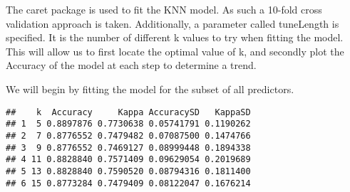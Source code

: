 \documentclass[
]{article}
\newenvironment{Shaded}{\begin{snugshade}}{\end{snugshade}}
\newcommand{\AttributeTok}[1]{\textcolor[rgb]{0.13,0.29,0.53}{#1}}
\newcommand{\CommentTok}[1]{\textcolor[rgb]{0.56,0.35,0.01}{\textit{#1}}}
\newcommand{\ConstantTok}[1]{\textcolor[rgb]{0.56,0.35,0.01}{#1}}
\newcommand{\DecValTok}[1]{\textcolor[rgb]{0.00,0.00,0.81}{#1}}
\newcommand{\FunctionTok}[1]{\textcolor[rgb]{0.13,0.29,0.53}{\textbf{#1}}}
\newcommand{\NormalTok}[1]{#1}
\newcommand{\OtherTok}[1]{\textcolor[rgb]{0.56,0.35,0.01}{#1}}
\newcommand{\SpecialCharTok}[1]{\textcolor[rgb]{0.81,0.36,0.00}{\textbf{#1}}}
\newcommand{\StringTok}[1]{\textcolor[rgb]{0.31,0.60,0.02}{#1}}
\begin{document}
\begin{Shaded}
\end{Shaded}

The caret package is used to fit the KNN model. As such a 10-fold cross
validation approach is taken. Additionally, a parameter called
tuneLength is specified. It is the number of different k values to try
when fitting the model. This will allow us to first locate the optimal
value of k, and secondly plot the Accuracy of the model at each step to
determine a trend.

We will begin by fitting the model for the subset of all predictors.

\begin{Shaded}
\end{Shaded}

\begin{verbatim}
##    k  Accuracy     Kappa AccuracySD   KappaSD
## 1  5 0.8897876 0.7730638 0.05741791 0.1190262
## 2  7 0.8776552 0.7479482 0.07087500 0.1474766
## 3  9 0.8776552 0.7469127 0.08999448 0.1894338
## 4 11 0.8828840 0.7571409 0.09629054 0.2019689
## 5 13 0.8828840 0.7590520 0.08794316 0.1811400
## 6 15 0.8773284 0.7479409 0.08122047 0.1676214
\end{verbatim}

\begin{Shaded}
\end{Shaded}
\end{document}
